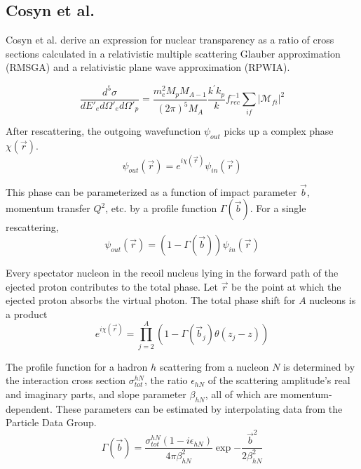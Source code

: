 \subsection{Cosyn et al.}

Cosyn et al. derive an expression for nuclear transparency as a ratio of cross
sections calculated in
a relativistic multiple scattering Glauber approximation (RMSGA)
and
a relativistic plane wave approximation (RPWIA).


\begin{equation}
    \frac{d^5\sigma}{d E'_e d \Omega'_e d \Omega'_p} =
        \frac{m_{e}^{2} M_{p} M_{A-1}}{(2 \pi)^{5} M_{A}}
        \frac{k^{\prime} k_{p}}{k}
        f_{rec }^{-1}
        \sum_{if}\left|\mathcal{M}_{fi}\right|^{2}
\end{equation}


After rescattering, the outgoing wavefunction $\psi_{out}$ picks up a complex
phase $\chi(\vec{r})$.
\begin{equation}
    \psi_{out}(\vec{r}) = e^{i\chi(\vec{r})} \psi_{in}(\vec{r})
\end{equation}

This phase can be parameterized as a function of impact parameter $\vec{b}$,
momentum transfer $Q^2$, etc. by a profile function $\Gamma(\vec{b})$.
For a single rescattering,
\begin{equation}
    \psi_{out}(\vec{r}) = (1-\Gamma(\vec{b})) \psi_{in}(\vec{r})
\end{equation}

Every spectator nucleon in the recoil nucleus lying in the forward path of the
ejected proton contributes to the total phase.
Let $\vec{r}$ be the point at which the ejected proton absorbs the virtual
photon.
The total phase shift for $A$ nucleons is a product
\begin{equation}
    e^{i\chi(\vec{r})} = \prod_{j=2}^{A} \left(1-\Gamma(\vec{b}_j)\theta(z_j-z)\right)
\end{equation}

The profile function for a hadron $h$ scattering from a nucleon $N$ is
determined by
the interaction cross section $\sigma^{hN}_{tot}$,
the ratio $\epsilon_{hN}$ of the scattering amplitude's real and imaginary parts,
and slope parameter $\beta_{hN}$,
all of which are momentum-dependent.
These parameters can be estimated by interpolating data from the Particle Data
Group.
\begin{equation}
    \Gamma(\vec{b}) =
        \frac{\sigma^{hN}_{tot}(1-i\epsilon_{hN})}
             {4\pi\beta_{hN}^2}
        \exp{-\frac{\vec{b}^2}{2\beta_{hN}^2}}
\end{equation}

